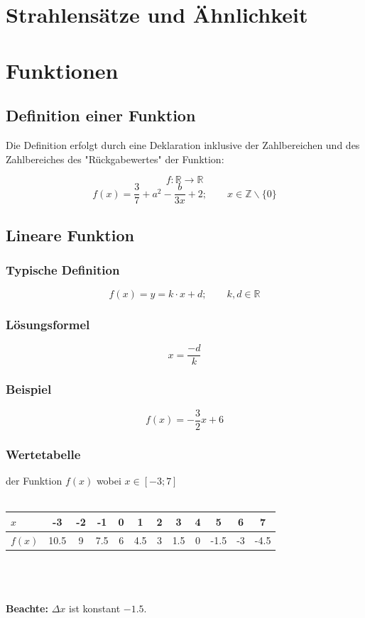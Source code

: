 \documentclass[12pt,a4paper]{scrbook}
\begin{document}
\chapter{Strahlensätze und Ähnlichkeit}


\chapter{Funktionen}
\section{Definition einer Funktion}
Die Definition erfolgt durch eine Deklaration inklusive
der Zahlbereichen und des Zahlbereiches des "Rückgabewertes" der Funktion:

\[ f : \mathbb{R} \rightarrow \mathbb{R}\]
\[ f(x) = \frac{3}{7} + a^2 - \frac{b}{3x} + 2; \quad\quad x \in \mathbb{Z}\backslash\{0\}\]

\section{Lineare Funktion}
\subsection{Typische Definition}
\[f(x) = y = k \cdot x + d; \quad\quad k, d \in \mathbb{R}\]
\subsection{Lösungsformel}
\[x = \frac{-d}{k}\]

\subsection{Beispiel}
\[f(x) = -\frac{3}{2}x + 6\]

\subsection{Wertetabelle} der Funktion $f(x)$ wobei $x \in [-3; 7]$\\\\
\begin{tabular}{l||c|c|c|c|c|c|c|c|c|c|c}
$x$ & -3 & -2 & -1 & 0 & 1 & 2 & 3 & 4 & 5 & 6 & 7\\
\hline
$f(x)$ & 10.5 & 9 & 7.5 & 6 & 4.5 & 3 & 1.5 & 0 & -1.5 & -3 & -4.5\\
\end{tabular}\\\\\\
\textbf{Beachte:} $\Delta x$ ist konstant $-1.5$.\\
\end{document}
